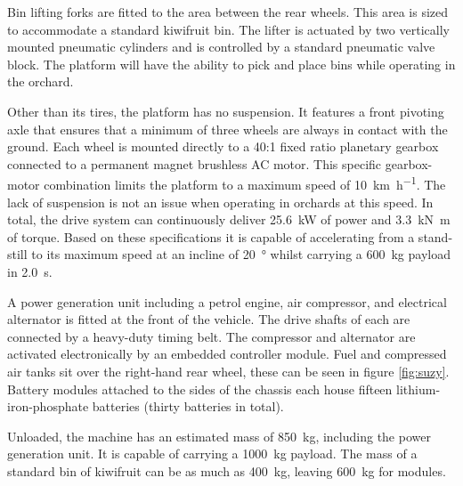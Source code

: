 \documentclass[preprint,authoryear,12pt]{elsarticle}
\begin{document}
        Bin lifting forks are fitted to the area between the rear wheels.
        This area is sized to accommodate a standard kiwifruit bin.
        The lifter is actuated by two vertically mounted pneumatic cylinders and is controlled by a standard pneumatic valve block.
        The platform will have the ability to pick and place bins while operating in the orchard.

        Other than its tires, the platform has no suspension.
        It features a front pivoting axle that ensures that a minimum of three wheels are always in contact with the ground.
        Each wheel is mounted directly to a 40:1 fixed ratio planetary gearbox connected to a permanent magnet brushless AC motor.
        This specific gearbox-motor combination limits the platform to a maximum speed of \SI{10}{\kilo\meter\per\hour}.
        The lack of suspension is not an issue when operating in orchards at this speed.
        In total, the drive system can continuously deliver \SI{25.6}{\kilo\watt} of power and \SI{3.3}{\kilo\newton\meter} of torque.
        Based on these specifications it is capable of accelerating from a stand-still to its maximum speed at an incline of \SI{20}{\degree} whilst carrying a \SI{600}{\kilo\gram} payload in \SI{2.0}{\second}.

        A power generation unit including a petrol engine, air compressor, and electrical alternator is fitted at the front of the vehicle.
        The drive shafts of each are connected by a heavy-duty timing belt.
        The compressor and alternator are activated electronically by an embedded controller module.
        Fuel and compressed air tanks sit over the right-hand rear wheel, these can be seen in figure \ref{fig:suzy}.
        Battery modules attached to the sides of the chassis each house fifteen lithium-iron-phosphate batteries (thirty batteries in total).

        Unloaded, the machine has an estimated mass of \SI{850}{\kilo\gram}, including the power generation unit.
        It is capable of carrying a \SI{1000}{\kilo\gram} payload.
        The mass of a standard bin of kiwifruit can be as much as \SI{400}{\kilo\gram}, leaving \SI{600}{\kilo\gram} for modules.
\end{document}
